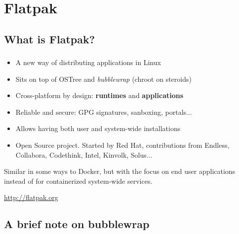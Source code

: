 %
%
%

\section{Flatpak}
\subsection{What is Flatpak?}

\begin{frame}
  \frametitle{\insertsubsection}

    \begin{itemize}
    \item A new way of distributing applications in Linux\vspacing
    \item Sits on top of OSTree and \textit{bubblewrap} (chroot on steroids)\vspacing
    \item Cross-platform by design: \textbf{runtimes} and \textbf{applications}\vspacing
    \item Reliable and secure: GPG signatures, sanboxing, portals...\vspacing
    \item Allows having both user and system-wide installations\vspacing
    \item Open Source project. Started by Red Hat, contributions from Endless, Collabora, Codethink, Intel, Kinvolk, Solus...
    \end{itemize}

    \begin{flushleft}
      Similar in some ways to Docker, but with the focus on end user
      applications instead of for containerized system-wide services.
    \end{flushleft}

  \begin{center}
    \url{http://flatpak.org}
  \end{center}
\end{frame}

\subsection{A brief note on bubblewrap}

